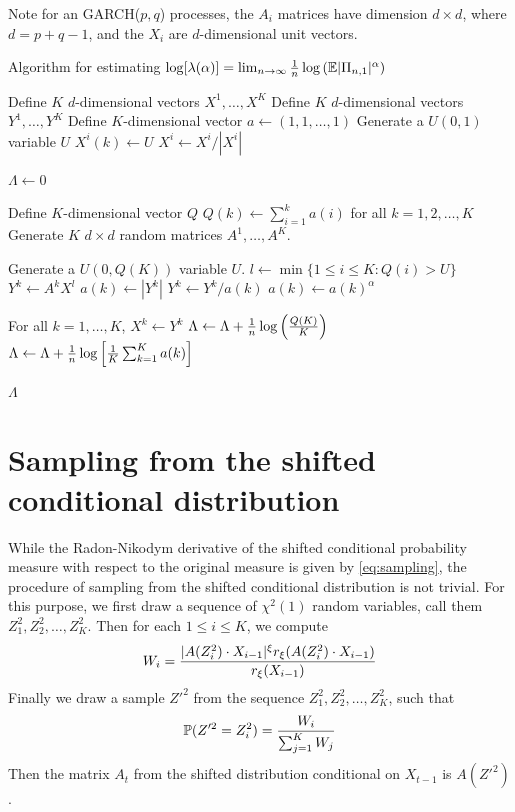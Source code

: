 Note for an GARCH($p, q$) processes, the $A_i$ matrices have dimension
$d \times d$, where $d = p + q - 1$, and the $X_i$ are $d$-dimensional
unit vectors. 
\begin{algorithm}[H]
  \caption{Algorithm for estimating
    $\log[\lambda(\alpha)] = \lim_{n \to \infty} {1 \over n}
    \log\left(\E |\Pi_{n, 1}|^\alpha \right)$}
  \label{alg:Lambda_estimation}
  \begin{algorithmic}
    \State Define $K$ $d$-dimensional vectors $X^1, \dots, X^K$
    \State Define $K$ $d$-dimensional vectors $Y^1, \dots, Y^K$
    \State Define $K$-dimensional vector $a \gets (1, 1, \dots, 1)$
    \State Generate a $U(0, 1)$ variable $U$
    \State $X^i(k) \gets U$ 
    \EndFor
    \State $X^i \gets X^i/|X^i|$
    \EndFor

    $\Lambda \gets 0$


    \State Define $K$-dimensional vector $Q$
    \State $Q(k) \gets \sum_{i=1}^k a(i)$ for all $k=1,2,\dots, K$
    \State Generate $K$ $d \times d$ random matrices $A^1, \dots, A^K$.

    \State Generate a $U(0, Q(K))$ variable $U$.
    \State $l \gets \min\{1 \leq i \leq K: Q(i) > U\}$
    \State $Y^k \gets A^k X^l$
    \State $a(k) \gets |Y^k|$
    \State $Y^k \gets Y^k/a(k)$
    \State $a(k) \gets a(k)^\alpha$
    \EndFor

    \State For all $k=1,\dots,K$, $X^k \gets Y^k$
    \State $\Lambda \gets \Lambda + {1 \over n}\log\left( { Q(K) \over K} \right)$
    \EndFor
    \State $\Lambda \gets \Lambda + {1 \over n}\log\left[ {1 \over K}\sum_{k=1}^K a(k) \right]$

    \Return $\Lambda$
    \EndProcedure
  \end{algorithmic}
\end{algorithm}

\section{Sampling from the shifted conditional distribution}
\label{sec:trhyy}
While the Radon-Nikodym derivative of the shifted conditional
probability measure with respect to the original measure is given by
\eqref{eq:sampling}, the procedure of sampling from the shifted
conditional distribution is not trivial. For this purpose, we first
draw a sequence of $\chi^2(1)$ random variables, call them
$Z_1^2, Z_2^2, \dots, Z_K^2$. Then for each $1 \leq i \leq K$, we
compute
\[
W_i = {
  |A(Z_i^2) \cdot X_{i-1}|^\xi
  r_\xi(A(Z_i^2) \cdot X_{i-1})
  \over
  r_\xi(X_{i-1})
}
\]
Finally we draw a sample $Z'^2$ from the sequence
$Z_1^2, Z_2^2, \dots, Z_K^2$, such that
\[
\P(Z'^2 = Z_i^2) = {
  W_i \over \sum_{j=1}^K W_j
}
\]
Then the matrix $A_t$ from the shifted distribution conditional on
$X_{t-1}$ is $A(Z'^2)$.

